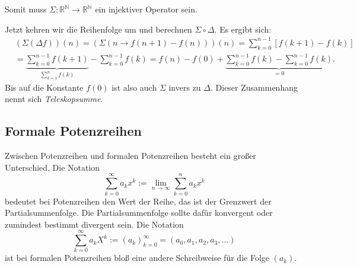 \documentclass[a4paper,11pt,fleqn,twoside]{scrartcl}
\numberwithin{equation}{section}
\newcommand{\N}{\mathbb N}
\newcommand{\R}{\mathbb R}
\begin{document}
Somit muss $\Sigma\colon\R^\N\to\R^\N$ ein injektiver Operator
sein.

Jetzt kehren wir die Reihenfolge um und berechnen $\Sigma\circ\Delta$.
Es ergibt sich:
\begin{align}
&(\Sigma(\Delta f))(n) = (\Sigma(n\to f(n+1)-f(n)))(n)
= \sum_{k=0}^{n-1} [f(k+1)-f(k)]\\
&= \underbrace{\sum_{k=0}^{n-1} f(k+1)}_{\sum_{k=1}^n f(k)}
- \sum_{k=0}^{n-1} f(k)
= f(n)-f(0) + \underbrace{\sum_{k=0}^{n-1} f(k)
- \sum_{k=0}^{n-1} f(k)}_{=0}.
\end{align}
Bis auf die Konstante $f(0)$ ist also auch $\Sigma$ invers zu $\Delta$.
Dieser Zusammenhang nennt sich \emph{Teleskopsumme}.

\subsection{Formale Potenzreihen}
Zwischen Potenzreihen und formalen Potenzreihen besteht
ein großer Unterschied. Die Notation
\begin{equation}
\sum_{k=0}^\infty a_k x^k := \lim_{n\to\infty}\sum_{k=0}^n a_k x^k
\end{equation}
bedeutet bei Potenzreihen den Wert der Reihe, das ist der
Grenzwert der Partialsummenfolge. Die Partialsummenfolge sollte
dafür konvergent oder zumindest bestimmt divergent sein.
Die Notation
\begin{equation}
\sum_{k=0}^\infty a_k X^k := (a_k)_{k=0}^\infty = (a_0,a_1,a_2,a_3,\ldots)
\end{equation}
ist bei formalen Potenzreihen bloß eine andere
Schreibweise für die Folge $(a_k)$.
\end{document}
